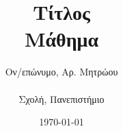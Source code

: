 \documentclass[11pt, a4paper]{article}
\begin{document}
\gr{}

\title{Τίτλος \\ \Large Μάθημα}
\author{Ον/επώνυμο, Αρ. Μητρώου \\ \\
        \small Σχολή, Πανεπιστήμιο}
\date{\today}

\maketitle











\end{document}
